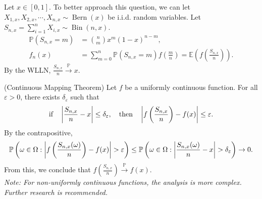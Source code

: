 \documentclass{huhtakm-template-book}
\newcommand{\prob}{\mathbb{P}}
\newcommand{\expect}{\mathbb{E}}
\DeclareMathOperator{\Bern}{Bern}
\DeclareMathOperator{\Bin}{Bin}
\begin{document}
    \begin{rem}
        Let $x\in[0,1]$. To better approach this question, we can let $X_{1,x},X_{2,x},\cdots,X_{n,x}\sim\Bern(x)$ be i.i.d. random variables. Let $S_{n,x}=\sum_{i=1}^{n}X_{i,x}\sim\Bin(n,x)$.
        \begin{align*}
            \prob(S_{n,x}=m)&=\binom{n}{m}x^{m}(1-x)^{n-m},\\
            f_{n}(x)&=\sum_{m=0}^{n}\prob(S_{n,x}=m)f\left(\frac{m}{n}\right)=\expect\left(f\left(\frac{S_{n,x}}{n}\right)\right).
        \end{align*}
        By the WLLN, $\frac{S_{n,x}}{n}\xrightarrow{\prob}x$.
    \end{rem}
    \begin{rem}(Continuous Mapping Theorem)
        Let $f$ be a uniformly continuous function. For all $\varepsilon>0$, there exists $\delta_{\varepsilon}$ such that
        \begin{equation*}
            \text{if}\quad\left|{\frac{S_{n,x}}{n}-x}\right|\leq\delta_{\varepsilon},\quad\text{then}\quad\left|{f\left(\frac{S_{n,x}}{n}\right)-f(x)}\right|\leq\varepsilon.
        \end{equation*}
        By the contrapositive,
        \begin{equation*}
            \prob\left(\omega\in\Omega:\abs{f\left(\frac{S_{n,x}(\omega)}{n}\right)-f(x)}>\varepsilon\right)\leq\prob\left(\omega\in\Omega:\abs{\frac{S_{n,x}(\omega)}{n}-x}>\delta_{\varepsilon}\right)\to 0.
        \end{equation*}
        From this, we conclude that $f\left(\frac{S_{n,x}}{n}\right)\xrightarrow{\prob}f(x)$.\\
        \textit{Note: For non-uniformly continuous functions, the analysis is more complex. Further research is recommended.}
    \end{rem}
    \newpage
\end{document}
